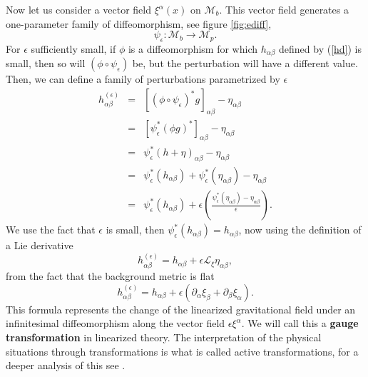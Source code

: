 Now let us consider a vector field $\xi^{\alpha}(x)$ on $\mathcal{M}_{b}$.
This vector field generates a one-parameter family of diffeomorphism,
see figure \ref{fig:ediff},
\[
\psi_{\epsilon}:\mathcal{M}_{b}\rightarrow\mathcal{M}_{p}.
\]
For $\epsilon$ sufficiently small, if $\phi$ is a diffeomorphism for
which $h_{\alpha\beta}$ defined by (\ref{hd}) is small, then so
will $\left(\phi\circ\psi_{\epsilon}\right)$ be, but the perturbation
will have a different value. Then, we can define a family of perturbations
parametrized by $\epsilon$
\[
\begin{array}{ccl}
h_{\alpha\beta}^{(\epsilon)} & = & \left[\left(\phi\circ\psi_{\epsilon}\right)^{*}g\right]_{\alpha\beta}-\eta_{\alpha\beta}\\
\  & = & \left[\psi_{\epsilon}^{*}\left(\phi g\right)^{*}\right]_{\alpha\beta}-\eta_{\alpha\beta}\\
\  & = & \psi_{\epsilon}^{*}\left(h+\eta\right)_{\alpha\beta}-\eta_{\alpha\beta}\\
\  & = & \psi_{\epsilon}^{*}\left(h_{\alpha\beta}\right)+\psi_{\epsilon}^{*}\left(\eta_{\alpha\beta}\right)-\eta_{\alpha\beta}\\
\  & = & {\displaystyle \psi_{\epsilon}^{*}\left(h_{\alpha\beta}\right)+\epsilon\left(\frac{\psi_{\epsilon}^{*}\left(\eta_{\alpha\beta}\right)-\eta_{\alpha\beta}}{\epsilon}\right).}
\end{array}
\]
We use the fact that $\epsilon$ is small, then $\psi_{\epsilon}^{*}\left(h_{\alpha\beta}\right)=h_{\alpha\beta}$,
now using the definition of a Lie derivative
\[
h_{\alpha\beta}^{(\epsilon)}=h_{\alpha\beta}+\epsilon\mathcal{L}_{\xi}\eta_{\alpha\beta},
\]
from the fact that the background metric is flat
\begin{equation}
h_{\alpha\beta}^{(\epsilon)}=h_{\alpha\beta}+\epsilon\left(\partial_{\alpha}\xi_{\beta}+\partial_{\beta}\xi_{\alpha}\right).\label{he}
\end{equation}
This formula represents the change of the linearized gravitational
field under an infinitesimal diffeomorphism along the vector field
$\epsilon\xi^{\alpha}$. We will call this a \textbf{gauge transformation}
in linearized theory. The interpretation of the physical situations
through transformations is what is called active transformations,
for a deeper analysis of this see \cite{HORTUA}.

